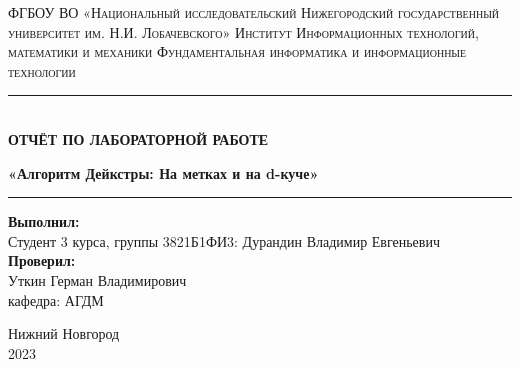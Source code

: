%

\begin{titlepage}
\begin{center}
\textsc{\normalsize ФГБОУ ВО «Национальный исследовательский Нижегородский
государственный университет им. Н.И. Лобачевского»
\vspace{5pt}
\break Институт Информационных технологий, математики и механики
\vspace{5pt}
\break Фундаментальная информатика и информационные технологии}\\



\vspace{150pt}
\rule{\textwidth}{0.1mm}\\[5mm]

\textbf{\Large ОТЧЁТ ПО ЛАБОРАТОРНОЙ РАБОТЕ}\\
\vspace{15pt}

\textbf{\large «Алгоритм Дейкстры: На метках и на d-куче»}\\
\rule{\textwidth}{0.1mm}
\vspace{10pt}
\end{center}

\vspace{100pt}



\begin{flushright}
\begin{minipage}{.5\textwidth}
\textbf{Выполнил:} \\[0.5mm] 
Студент 3 курса, группы 3821Б1ФИ3:
\break Дурандин Владимир Евгеньевич\\[5mm]

\textbf{Проверил:} \\[0.5mm]
Уткин Герман Владимирович\\
кафедра: АГДМ
\end{minipage}
\end{flushright}


\vfill
\begin{center}
 Нижний Новгород\\
 2023
\end{center}
\end{titlepage}
